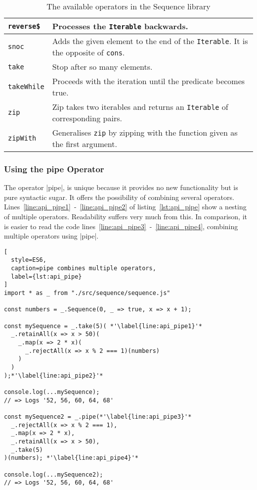 \begin{table}[H]
\begin{tabularx}{\textwidth}{| l | X |}
    \texttt{reverse\$} & Processes the \texttt{Iterable} backwards. \\ \hline 
    \texttt{snoc} & Adds the given element to the end of the \texttt{Iterable}. It is the opposite of \texttt{cons}.\\ \hline 
    \texttt{take} & Stop after so many elements. \\ \hline 
    \texttt{takeWhile} & Proceeds with the iteration until the predicate becomes true. \\ \hline 
    \texttt{zip} & Zip takes two iterables and returns an \texttt{Iterable} of corresponding pairs. \\ \hline 
    \texttt{zipWith} & Generalises \texttt{zip} by zipping with the function given as the first argument. \\ \hline 
  \end{tabularx}
  \caption{The available operators in the Sequence library}
  \label{tab:api_operators}
\end{table}

\subsubsection{Using the pipe Operator} %
\label{subsub:Using the pipe Operator}
The operator |pipe|, is unique because it provides no new functionality but is
pure syntactic sugar. It offers the possibility of combining several operators.
Lines~\ref{line:api_pipe1}~-~\ref{line:api_pipe2} of listing~\ref{lst:api_pipe}
show a nesting of multiple operators. Readability suffers very much from this.
In comparison, it is easier to read the code
lines~\ref{line:api_pipe3}~-~\ref{line:api_pipe4}, combining multiple operators
using |pipe|. 
\begin{lstlisting}[
  style=ES6,
  caption=pipe combines multiple operators,
  label={lst:api_pipe}
]
import * as _ from "./src/sequence/sequence.js"

const numbers = _.Sequence(0, _ => true, x => x + 1);

const mySequence = _.take(5)( *'\label{line:api_pipe1}'*
  _.retainAll(x => x > 50)(
    _.map(x => 2 * x)(
      _.rejectAll(x => x % 2 === 1)(numbers)
    )
  )
);*'\label{line:api_pipe2}'*

console.log(...mySequence);
// => Logs '52, 56, 60, 64, 68'

const mySequence2 = _.pipe(*'\label{line:api_pipe3}'*
  _.rejectAll(x => x % 2 === 1),
  _.map(x => 2 * x),
  _.retainAll(x => x > 50),
  _.take(5)
)(numbers); *'\label{line:api_pipe4}'*

console.log(...mySequence2);
// => Logs '52, 56, 60, 64, 68'
\end{lstlisting}

